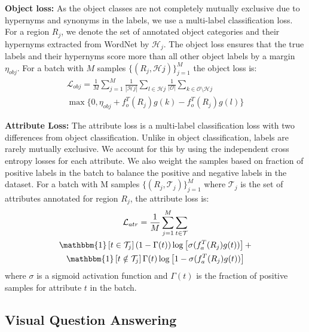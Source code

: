 \documentclass[10pt,twocolumn,letterpaper]{article}
\begin{document}
\noindent 
\textbf{Object loss:} As the object classes are not completely mutually exclusive due to hypernyms and synonyms in the labels, we use a multi-label classification loss. For a region $R_j$, we denote the set of annotated object categories and their hypernyms extracted from WordNet \cite{miller1995acm} by $\mathcal{H}_j$. The object loss ensures that the true labels and their hypernyms score more than all other object labels by a margin $\eta_{obj}$. For a batch with $M$ samples $\{(R_j,\mathcal{H}j)\}_{j=1}^{M}$ the object loss is:
\begin{multline}
\mathcal{L}_{obj} = \frac{1}{M}\sum_{j=1}^{M}\frac{1}{|\mathcal{H}j|}\sum_{l \in \mathcal{H}j} \frac{1}{|\mathcal{O}|}
\sum_{k \in \mathcal{O}\setminus \mathcal{H}j} \\
\max\{0,\eta_{obj} + f_o^T(R_j)g(k) - f_o^T(R_j)g(l)\}
\end{multline}

\noindent
\textbf{Attribute Loss:} The attribute loss is a multi-label classification loss with two differences from object classification. Unlike in object classification, labels are rarely mutually exclusive. We account for this by using the independent cross entropy losses for each attribute. We also weight the samples based on fraction of positive labels in the batch to balance the positive and negative labels in the dataset. For a batch with M samples $\{(R_j,\mathcal{T}_j)\}_{j=1}^{M}$ where $\mathcal{T}_j$ is the set of attributes annotated for region $R_j$, the attribute loss is:
\begin{multline}
\mathcal{L}_{atr} = \frac{1}{M}
\sum_{j=1}^{M} 
\sum_{t \in \mathcal{T}} \\
\mathbbm{1}\left[t \in \mathcal{T}_j\right](1-\Gamma(t))\log\left[\sigma(f_a^T(R_j)g(t))\right] + \\
\mathbbm{1}\left[t \notin \mathcal{T}_j\right]\Gamma(t)\log\left[1-\sigma(f_a^T(R_j)g(t))\right]
\end{multline}    
where $\sigma$ is a sigmoid activation function and $\Gamma(t)$ is the fraction of positive samples for attribute $t$ in the batch.


\subsection{Visual Question Answering} \label{sec:vqa}
\end{document}
